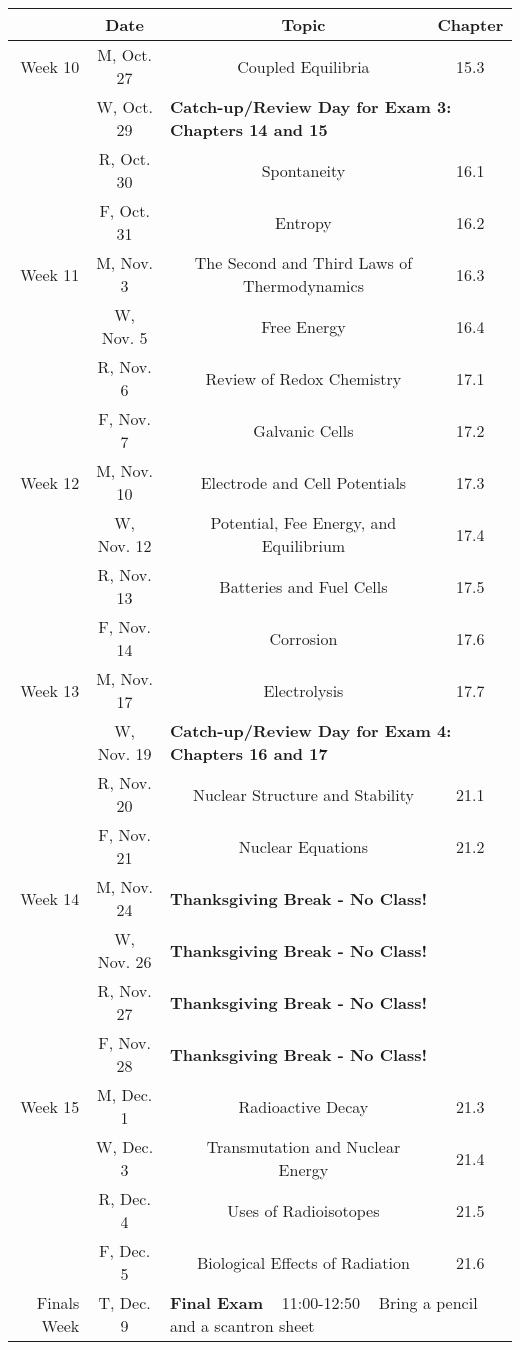 \documentclass[12pt, letterpaper]{article}
\begin{document}
\begin{tabular}{rcccc}
& Date && Topic & Chapter\\
\midrule
Week 10 & M, Oct. 27&& Coupled Equilibria & 15.3\\
& W, Oct. 29& \multicolumn{3}{l}{\textbf{Catch-up/Review Day for Exam 3: Chapters 14 and 15}}\\
& R, Oct. 30&& Spontaneity & 16.1\\
& F, Oct. 31&& Entropy & 16.2\\
\midrule
Week 11 & M, Nov. 3&& The Second and Third Laws of Thermodynamics & 16.3\\
& W, Nov. 5&& Free Energy & 16.4\\
& R, Nov. 6&& Review of Redox Chemistry & 17.1\\
& F, Nov. 7&& Galvanic Cells & 17.2\\
\midrule
Week 12 & M, Nov. 10&& Electrode and Cell Potentials & 17.3\\
& W, Nov. 12&& Potential, Fee Energy, and Equilibrium & 17.4\\
& R, Nov. 13&& Batteries and Fuel Cells & 17.5\\
& F, Nov. 14&& Corrosion & 17.6\\
\midrule
Week 13 & M, Nov. 17&& Electrolysis & 17.7\\
& W, Nov. 19& \multicolumn{3}{l}{\textbf{Catch-up/Review Day for Exam 4: Chapters 16 and 17}}\\
& R, Nov. 20&& Nuclear Structure and Stability & 21.1\\
& F, Nov. 21&& Nuclear Equations & 21.2\\
\midrule
Week 14 & M, Nov. 24& \multicolumn{3}{l}{\textbf{Thanksgiving Break - No Class!}}\\
& W, Nov. 26& \multicolumn{3}{l}{\textbf{Thanksgiving Break - No Class!}}\\
& R, Nov. 27& \multicolumn{3}{l}{\textbf{Thanksgiving Break - No Class!}}\\
& F, Nov. 28& \multicolumn{3}{l}{\textbf{Thanksgiving Break - No Class!}}\\
\midrule
Week 15 & M, Dec. 1&& Radioactive Decay & 21.3\\
& W, Dec. 3&& Transmutation and Nuclear Energy & 21.4\\
& R, Dec. 4&& Uses of Radioisotopes & 21.5\\
& F, Dec. 5&& Biological Effects of Radiation & 21.6\\
\midrule
\midrule
Finals Week & T, Dec. 9 & \multicolumn{3}{l}{\textbf{Final Exam} ~ 11:00-12:50 ~ Bring a pencil and a scantron sheet}\\
\end{tabular}
\end{document}

